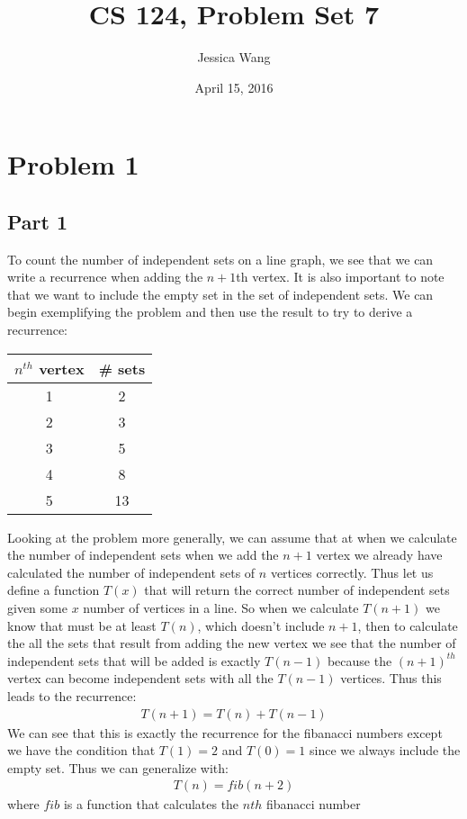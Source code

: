 \documentclass[11pt]{article}
\title{CS 124, Problem Set 7}
\author{Jessica Wang}
\date{April 15, 2016}
\begin{document}
\maketitle
\section*{Problem 1}
\subsection*{Part 1}
To count the number of independent sets on a line graph, we see that we can write a recurrence when adding the $n+1$th vertex. It is also important to note that we want to include the empty set in the set of independent sets. We can begin exemplifying the problem and then use the result to try to derive a recurrence:
\begin{center}
\begin{tabular}{c|c}
$n^{th}$ vertex&\# sets\\\hline
1 & 2\\
2 & 3\\
3 & 5\\
4 & 8\\
5 & 13
\end{tabular}
\end{center}
Looking at the problem more generally, we can assume that at when we calculate the number of independent sets when we add the $n+1$ vertex we already have calculated the number of independent sets of $n$ vertices correctly. Thus let us define a function $T(x)$ that will return the correct number of independent sets given some $x$ number of vertices in a line. So when we calculate $T(n+1)$ we know that must be at least $T(n)$, which doesn't include $n+1$, then to calculate the all the sets that result from adding the new vertex we see that the number of independent sets that will be added is exactly $T(n-1)$ because the $(n+1)^{th}$ vertex can become independent sets with all the $T(n-1)$ vertices. Thus this leads to the recurrence:
\begin{align*}
T(n+1) = T(n) + T(n-1)
\end{align*}
We can see that this is exactly the recurrence for the fibanacci numbers except we have the condition that $T(1) = 2$ and $T(0) = 1$ since we always include the empty set. Thus we can generalize with:
\begin{align*}
T(n) = fib(n+2)
\end{align*}
where $fib$ is a function that calculates the $nth$ fibanacci number
\end{document}
